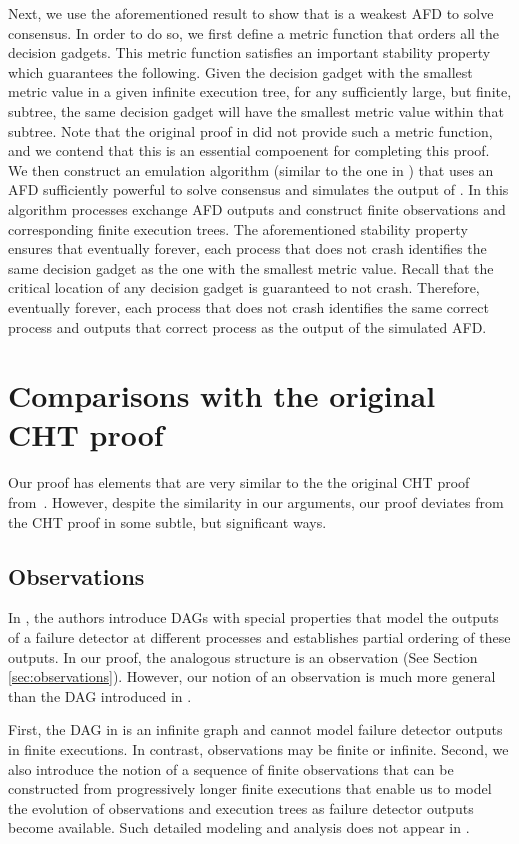 \documentclass[11pt]{article}
\numberwithin{theorem}{section}
\begin{document}
Next, we use the aforementioned result to show that  is a weakest AFD to solve consensus. In order to do so, we first define a metric function that orders all the decision gadgets. This metric function satisfies an important stability property which guarantees the following. Given the decision gadget with the smallest metric value in a given infinite execution tree, for any sufficiently large, but finite, subtree, the same decision gadget will have the smallest metric value within that subtree. Note that the original proof in \cite{chan:twfdf} did not provide such a metric function, and we contend that this is an essential compoenent for completing this proof. We then construct an emulation algorithm (similar to the one in \cite{chan:twfdf}) that uses an AFD sufficiently powerful to solve consensus and simulates the output of . In this algorithm processes exchange AFD outputs and construct finite observations and corresponding finite execution trees. The aforementioned stability property ensures that eventually forever, each process that does not crash identifies the same decision gadget as the one with the smallest metric value. Recall that the critical location of any decision gadget is guaranteed to not crash. Therefore, eventually forever, each process that does not crash identifies the same correct process and outputs that correct process as the output of the simulated  AFD.


\section{Comparisons with the original CHT proof}\label{sec:comarisonWithCHT}
Our proof has elements that are very similar to the the original CHT proof from~\cite{chan:twfdf}. However, despite the similarity in our arguments, our proof deviates from the CHT proof in some subtle, but significant ways.

\subsection{Observations}
In \cite{chan:twfdf}, the authors introduce DAGs with special properties that model the outputs of a failure detector at different processes and establishes partial ordering of these outputs. In our proof, the analogous structure is an observation (See Section \ref{sec:observations}). However, our notion of an observation is much more general than the DAG introduced in \cite{chan:twfdf}.

First, the DAG in \cite{chan:twfdf} is an infinite graph and cannot model failure detector outputs in finite executions. In contrast, observations may be finite or infinite. Second, we also introduce the notion of a sequence of finite observations that can be constructed from progressively longer finite executions that enable us to model the evolution of observations and execution trees as failure detector outputs become available. Such detailed modeling and analysis does not appear in \cite{chan:twfdf}.
\end{document}
